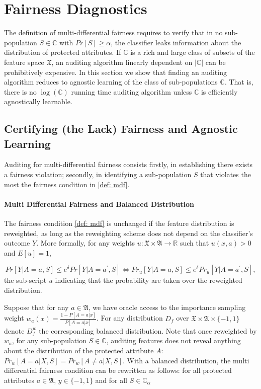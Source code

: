\documentclass{article}
\begin{document}
\section{Fairness Diagnostics}

The definition of multi-differential fairness requires to verify that in no sub-population $S\in \mathbb{C}$ with $Pr[S]\geq \alpha$, the classifier leaks information about the distribution of protected attributes. If $\mathbb{C}$ is a rich and large class of subsets of the feature space $\mathfrak{X}$, an auditing algorithm linearly dependent on $|\mathbb{C}|$ can be prohibitively expensive. In this section we show that finding an auditing algorithm reduces to agnostic learning of the class of sub-populations $\mathbb{C}$. That is, there is no $\log(\mathbb{C})$ running time auditing algorithm unless $\mathbb{C}$ is efficiently agnostically learnable.  

\subsection{Certifying (the Lack) Fairness and Agnostic Learning}
Auditing for multi-differential fairness consists firstly, in establishing there exists a fairness violation; secondly, in identifying a sub-population $S$ that violates the most the fairness condition in \ref{def: mdf}. 

\paragraph{Multi Differential Fairness and Balanced Distribution}
The fairness condition \ref{def: mdf} is unchanged if the feature distribution is reweighted, as long as the reweighting scheme does not depend on the classifier's outcome $Y$. More formally, for any weights $u: \mathfrak{X}\times \mathfrak{A} \rightarrow \mathbb{R}$ such that $u(x,a)> 0$ and $E[u]=1$, 

\begin{equation}
Pr[Y|A=a, S] \leq e^{\delta} Pr[Y|A=a^{'}, S] \iff Pr_{u}[Y|A=a, S] \leq e^{\delta} Pr_{u}[Y|A=a^{'}, S],
\end{equation}
the sub-script $u$ indicating that the probability are taken over the reweighted distribution. 

\bigskip
Suppose that for any $a \in \mathfrak{A}$, we have oracle access to the importance sampling weight $w_{a}(x)=\frac{1 - P[A=a|x]}{P[A=a|x]}$. For any distribution $D_{f}$ over $\mathfrak{X} \times \mathfrak{A}\times \{-1, 1\}$ denote $D_{f}^{w}$ the corresponding balanced distribution. Note that once reweighted by $w_{a}$, for any sub-population $S\in \mathbb{C}$, auditing features does not reveal anything about the distribution of the protected attribute $A$: $Pr_{w}[A=a|X, S]=Pr_{w}[A\neq a|X, S]$. With a balanced distribution, the multi differential fairness condition can be rewritten as follows: for all protected attributes $a\in \mathfrak{A}$, $y\in \{-1,1\}$ and for all $S\in \mathbb{C}_{\alpha}$
\end{document}
